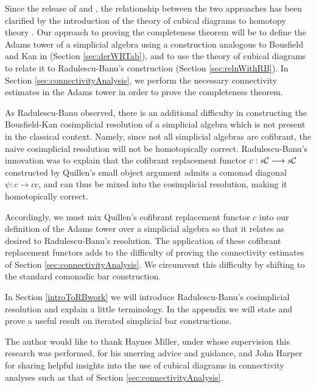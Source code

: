 \documentclass[11pt]{amsart}
\theoremstyle{plain}
\begin{document}
Since the release of \cite{BK_pairings.pdf} and \cite{BousKanSSeq.pdf}, the relationship between the two approaches has been clarified by the introduction of the theory of cubical diagrams to homotopy theory \cite{GoodwillieCalcII}. %
Our approach to proving the completeness theorem will be to define the Adams tower of a simplicial algebra using a construction analogous to Bousfield and Kan in \cite{BK_pairings.pdf} (Section \ref{sec:derWRTab}), and to use the theory of cubical diagrams %
to relate it to Radulescu-Banu's construction (Section \ref{sec:relnWithRB}). In Section \ref{sec:connectivityAnalysis}, we perform the necessary connectivity estimates in the Adams tower in order to prove the completeness theorem. 

As Radulescu-Banu observed, there is an additional difficulty in constructing the Bousfield-Kan cosimplicial resolution of a simplicial algebra which is not present in the classical context. Namely, since not all simplicial algebras are cofibrant, the naive cosimplicial resolution will not be homotopically correct. Radulescu-Banu's innovation was to explain that the cofibrant replacement functor $c:s\mathcal{C}\longrightarrow s\mathcal{C}$ constructed by Quillen's small object argument \cite{QuillenHomAlg.pdf} admits a comonad diagonal $\psi:c\to cc$, and can thus be mixed into the cosimplicial resolution, making it homotopically correct. 

Accordingly, we must mix Quillen's cofibrant replacement functor $c$ into our definition of the Adams tower over a simplicial algebra so that it relates as desired to Radulescu-Banu's resolution. The application of these cofibrant replacement functors adds to the difficulty of proving the connectivity estimates of Section \ref{sec:connectivityAnalysis}. We circumvent this difficulty by shifting to the standard comonadic bar construction.

In Section \ref{introToRBwork} we will introduce Radulescu-Banu's cosimplicial resolution and explain a little terminology. In the appendix we will state and prove a useful result on iterated simplicial bar constructions.

The author would like to thank Haynes Miller, under whose supervision this research was performed, for his unerring advice and guidance, and John Harper for sharing helpful insights into the use of cubical diagrams in connectivity analyses such as that of Section \ref{sec:connectivityAnalysis}.
\end{document}
